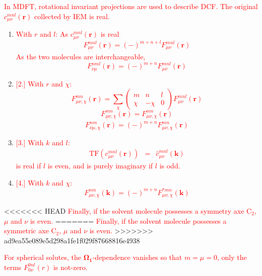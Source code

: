\textcolor{red}{In MDFT, rotational invariant projections are used
to describe DCF. The original $c_{\mu\nu}^{mnl}(\mathbf{r})$ collected
by IEM is real.}
\begin{enumerate}
\item \textcolor{red}{With $r$ and $l$: As $c_{\mu\nu}^{mnl}(\mathbf{r})$
is real
\begin{equation}
F_{\underline{\mu}\underline{\nu}}^{mnl}(\mathbf{r})=\left(-\right)^{m+n+l}F_{\mu\nu}^{mnl}(\mathbf{r})
\end{equation}
As the two molecules are interchangeable, 
\begin{equation}
F_{\nu\mu}^{nml}(\mathbf{r})=\left(-\right)^{m+n}F_{\mu\nu}^{mnl}(\mathbf{r})
\end{equation}
}
\item \textcolor{red}{%
[2.]%
With $r$ and $\chi$:
\begin{equation}
F_{\mu\nu,\chi}^{mn}(\mathbf{r})=\sum_{\chi}\left(\begin{array}{ccc}
m & n & l\\
\chi & -\chi & 0
\end{array}\right)F_{\mu\nu}^{mnl}(\mathbf{r})
\end{equation}
\begin{equation}
F_{\underline{\mu}\underline{\nu},\underline{\chi}}^{mn}(\mathbf{r})=F_{\mu\nu,\chi}^{mn}(\mathbf{r})
\end{equation}
\begin{equation}
F_{\nu\mu,\chi}^{nm}(\mathbf{r})=\left(-\right)^{m+n}F_{\mu\nu,\chi}^{mn}(\mathbf{r})
\end{equation}
}
\item \textcolor{red}{%
[3.]%
With $k$ and $l$:
\begin{eqnarray}
\mathrm{TF}(c_{\mu\nu}^{mnl}(\mathbf{r})) & = & \hat{c}_{\mu\nu}^{mnl}(\mathbf{k})
\end{eqnarray}
 is real if $l$ is even, and is purely imaginary if $l$ is odd.}
\item \textcolor{red}{%
[4.]%
With $k$ and $\chi$:
\begin{equation}
F_{\mu\nu,\underline{\chi}}^{mn}(\mathbf{k})=\left(-\right)^{m+n}F_{\mu\nu,\chi}^{*mn}(\mathbf{k})
\end{equation}
}
\end{enumerate}
<<<<<<< HEAD
\textcolor{red}{Finally, if the solvent molecule possesses a symmetry
axe $\mathrm{C}_{2}$, $\mu$ and $\nu$ is even.}
=======
\textcolor{red}{Finally, if the solvent molecule possesses a symmetric
axe $\mathrm{C}_{2}$, $\mu$ and $\nu$ is even.} %
>>>>>>> ad9ea55e089e5d298a1fe1f029f87668816e4938

\textcolor{red}{For spherical solutes, the $\mathbf{\Omega_{1}}$-dependence
vanishes so that $m=\mu=0$, only the terms $F_{0\nu}^{0nl}(r)$ is
not-zero.}
